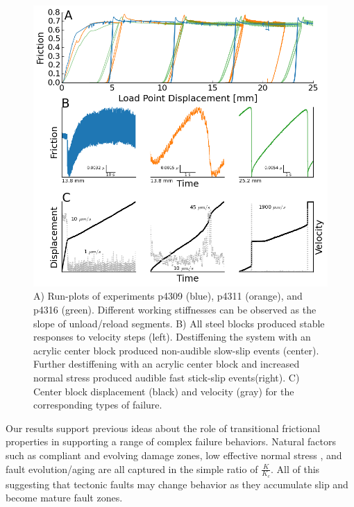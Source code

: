 \documentclass[11pt]{article}
\begin{document}
\begin{figure}
	\centering
		\includegraphics[scale=0.7]{../Figures/Fig_Runplot/runplot.png}
   	\caption{A) Run-plots of experiments p4309 (blue), p4311 (orange), and p4316
   	(green). Different working stiffnesses can be observed as the slope of
   	unload/reload segments. B) All steel blocks produced stable responses to
   	velocity steps (left). Destiffening the system with an acrylic center block
   	produced non-audible slow-slip events (center). Further destiffening with an
   	acrylic center block and increased normal stress produced audible fast
   	stick-slip events(right). C) Center block displacement (black) and velocity
   	(gray) for the corresponding types of failure.}
  	\label{Figure:Runplot}
\end{figure}

Our results support previous ideas about the role of transitional frictional
properties in supporting a range of complex failure behaviors. Natural factors
such as compliant and evolving damage zones, low effective normal stress
\cite{audet2009seismic,kitajima2012elevated,shelly2015complexity},
and fault evolution/aging \cite{ikari2011relation} are all captured in the
simple ratio of $\frac{K}{K_c}$.  All of this
suggesting that tectonic faults may change behavior as they accumulate slip and
become mature fault zones.
\end{document}
